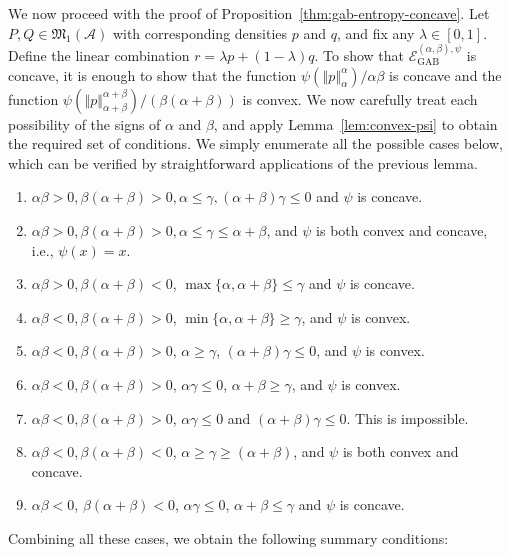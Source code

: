 \documentclass[11pt]{article}
\theoremstyle{plain}
\theoremstyle{remark}
\newcommand{\Acal}{\mathcal{A}}
\newcommand{\Mfrak}{\mathfrak{M}}
\newcommand{\eGAB}{\mathcal{E}_{\mathrm{GAB}}}
\newcommand{\norm}[1]{\left\Vert #1 \right\Vert}
\begin{document}
We now proceed with the proof of Proposition~\ref{thm:gab-entropy-concave}. Let $P, Q \in \Mfrak_{1}(\Acal)$ with corresponding densities $p$ and $q$, and fix any $\lambda \in [0, 1]$. Define the linear combination $r = \lambda p + (1-\lambda)q$. To show that $\eGAB^{(\alpha,\beta),\psi}$ is concave, it is enough to show that the function $\psi(\norm{p}_\alpha^\alpha)/\alpha\beta$ is concave and the function $\psi(\norm{p}_{\alpha+\beta}^{\alpha+\beta})/(\beta(\alpha+\beta))$ is convex. We now carefully treat each possibility of the signs of $\alpha$ and $\beta$, and apply Lemma~\ref{lem:convex-psi} to obtain the required set of conditions. We simply enumerate all the possible cases below, which can be verified by straightforward applications of the previous lemma.
\begin{enumerate}
    \item $\alpha\beta > 0, \beta(\alpha + \beta) > 0, \alpha \leq \gamma, (\alpha +\beta)\gamma \leq 0$ and $\psi$ is concave.
    \item $\alpha\beta > 0, \beta(\alpha + \beta) > 0, \alpha \leq \gamma \leq \alpha + \beta$, and $\psi$ is both convex and concave, i.e., $\psi(x) = x$.
    \item $\alpha\beta > 0, \beta(\alpha+\beta) < 0$, $\max\{ \alpha, \alpha+\beta\} \leq \gamma$ and $\psi$ is concave.
    \item $\alpha\beta < 0, \beta(\alpha + \beta) > 0$, $\min\{\alpha, \alpha + \beta\} \geq \gamma$, and $\psi$ is convex.
    \item $\alpha\beta < 0, \beta(\alpha + \beta) > 0$, $\alpha \geq \gamma$, $(\alpha + \beta)\gamma \leq 0$, and $\psi$ is convex.
    \item $\alpha\beta < 0, \beta(\alpha + \beta) > 0$, $\alpha\gamma \leq 0$, $\alpha + \beta \geq \gamma$, and $\psi$ is convex.
    \item $\alpha\beta < 0, \beta(\alpha + \beta) > 0$, $\alpha\gamma \leq 0$ and $(\alpha+\beta)\gamma \leq 0$. This is impossible.
    \item $\alpha\beta < 0, \beta(\alpha+\beta) < 0$, $\alpha \geq \gamma \geq (\alpha + \beta)$, and $\psi$ is both convex and concave.
    \item $\alpha\beta < 0$, $\beta (\alpha + \beta) < 0$, $\alpha\gamma \leq 0$, $\alpha + \beta \leq \gamma$ and $\psi$ is concave.
\end{enumerate}
\noindent Combining all these cases, we obtain the following summary conditions:
\end{document}
